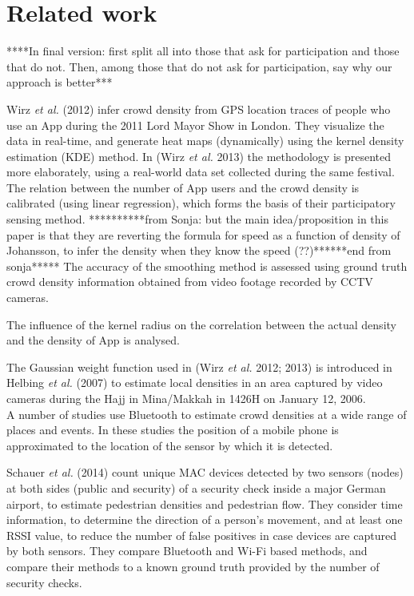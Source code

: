 \documentclass[10pt,a4paper]{article}
\begin{document}
\section{Related work}\label{sec:relatedwork}
****In final version: first split all into those that ask for participation and those that do not. Then, among those that do not ask for participation, say why our approach is better***

Wirz \textit{et al.} (2012) \cite{wirz:1} infer crowd density from GPS location traces of people who use an App during the 2011 Lord Mayor Show in London. They visualize the data in real-time, and generate heat maps (dynamically) using the kernel density estimation (KDE) method. In (Wirz \textit{et al.} 2013) \cite{wirz:2} the methodology is presented more elaborately, using a real-world data set collected during the same festival. The relation between the number of App users and the crowd density is calibrated (using linear regression), which forms the basis of their participatory sensing method. **********from Sonja: but the main idea/proposition in this paper is that they are reverting the formula for speed as a function of density of Johansson, to infer the density when they know the speed (??)******end from sonja*****
The accuracy of the smoothing method is assessed using ground truth crowd density information obtained from video footage recorded by CCTV cameras. 

The influence of the kernel radius on the correlation between the actual density and the density of App is analysed.

The Gaussian weight function used in (Wirz \textit{et al.} 2012; 2013) \cite{wirz:1}\cite{wirz:2} is introduced in Helbing \textit{et al.} (2007) \cite{helbing:1} to estimate local densities in an area captured by video cameras during the Hajj in Mina/Makkah in 1426H on January 12, 2006.\\

A number of studies use Bluetooth to estimate crowd densities at a wide range of places and events.
In these studies the position of a mobile phone is approximated to the location of the sensor by which it is detected.

Schauer \textit{et al.} (2014) \cite{schauer:1} count unique MAC devices detected by two sensors (nodes) at both sides (public and security) of a security check inside a major German airport, to estimate pedestrian densities and pedestrian flow. They consider time information, to determine the direction of a person's movement, and at least one RSSI value, to reduce the number of false positives in case devices are captured by both sensors. They compare Bluetooth and Wi-Fi based methods, and compare their methods to a known ground truth provided by the number of security checks.
\end{document}
